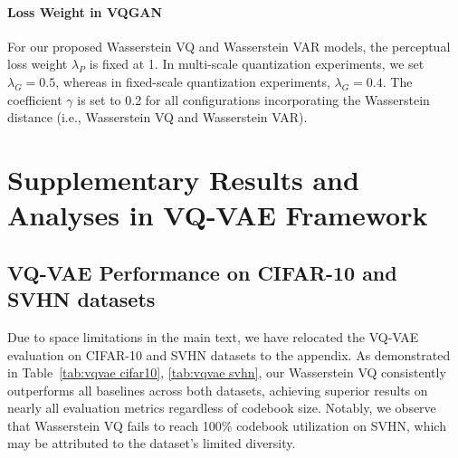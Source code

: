 \paragraph{Loss Weight in VQGAN} For our proposed Wasserstein VQ and Wasserstein VAR models, the perceptual loss weight $\lambda_P$ is fixed at 1. In multi-scale quantization experiments, we set $\lambda_G = 0.5$, whereas in fixed-scale quantization experiments, $\lambda_G = 0.4$. The coefficient $\gamma$ is set to 0.2 for all configurations incorporating the Wasserstein distance (i.e., Wasserstein VQ and Wasserstein VAR).



\section{Supplementary Results and Analyses in VQ-VAE Framework}
\subsection{VQ-VAE Performance on  CIFAR-10 and SVHN datasets}
\label{appendix:vqvae cifar-10 and svhn}
Due to space limitations in the main text, we have relocated the VQ-VAE evaluation on CIFAR-10 and SVHN datasets to the appendix. As demonstrated in Table~\ref{tab:vqvae cifar10}, \ref{tab:vqvae svhn}, our Wasserstein VQ consistently outperforms all baselines across both datasets, achieving superior results on nearly all evaluation metrics regardless of codebook size. Notably, we observe that Wasserstein VQ fails to reach 100\% codebook utilization on SVHN, which may be attributed to the dataset’s limited diversity.

